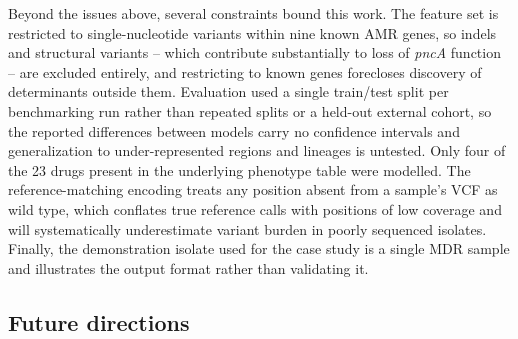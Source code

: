 Beyond the issues above, several constraints bound this work. The feature set is restricted to single-nucleotide variants within nine known AMR genes, so indels and structural variants -- which contribute substantially to loss of \emph{pncA} function \cite{yadon2017pnca} -- are excluded entirely, and restricting to known genes forecloses discovery of determinants outside them. Evaluation used a single train/test split per benchmarking run rather than repeated splits or a held-out external cohort, so the reported differences between models carry no confidence intervals and generalization to under-represented regions and lineages is untested. Only four of the 23 drugs present in the underlying phenotype table were modelled. The reference-matching encoding treats any position absent from a sample's VCF as wild type, which conflates true reference calls with positions of low coverage and will systematically underestimate variant burden in poorly sequenced isolates. Finally, the demonstration isolate used for the case study is a single MDR sample and illustrates the output format rather than validating it.

\subsection{Future directions}

